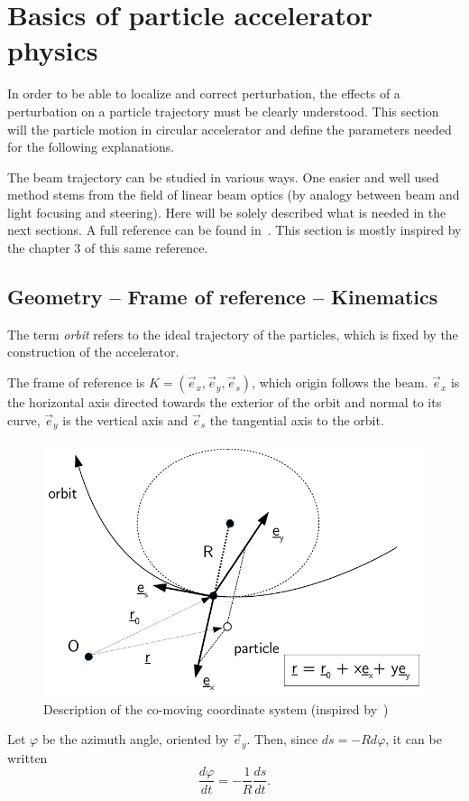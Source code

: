 
\chapter{Basics of particle accelerator physics}
\label{sec:acc_physics}
In order to be able to localize and correct perturbation, the effects of a perturbation on a particle trajectory must be clearly understood. This section will the particle motion in circular accelerator and define the parameters needed for the following explanations.

The beam trajectory can be studied in various ways. One easier and well used method stems from the field of linear beam optics (by analogy between beam and light focusing and steering). Here will be solely described what is needed in the next sections. A full reference can be found in~\cite{book:wille}. This section is mostly inspired by the chapter 3 of this same reference.

\section{Geometry -- Frame of reference -- Kinematics}
The term \emph{orbit} refers to the ideal trajectory of the particles, which is fixed by the construction of the accelerator.

The frame of reference is $K=(\vec{e}_x,\vec{e}_y, \vec{e}_s)$, which origin follows the beam. $\vec{e}_x$ is the horizontal axis directed towards the exterior of the orbit and normal to its curve, $\vec{e}_y$ is the vertical axis and $\vec{e}_s$ the tangential axis to the orbit.
\begin{figure}
    \centering
    \includegraphics[width=0.8\linewidth]{img/orbit_coordinates.pdf}
    \caption[Description of the co-moving coordinate system]{\label{fig:coordinate system}Description of the co-moving coordinate system (inspired by~\cite{book:wille})}
\end{figure}
Let $\varphi$ be the azimuth angle, oriented by $\vec{e}_y$. Then, since $ds = -R d\varphi$, it can be written
\begin{equation}
\frac{d \varphi}{d t}  = -\frac{1}{R} \frac{d s}{d t}.
\end{equation}

